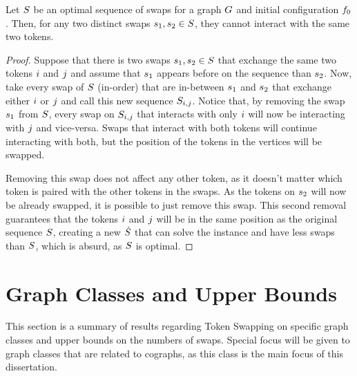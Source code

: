 \documentclass[msc]{ppgccufmg}    %
\begin{document}
\begin{corollary}
\label{cor:sametokens}
Let $S$ be an optimal sequence of swaps for a graph $G$ and
initial configuration $f_{0}$.
Then, for any two distinct swaps $s_{1},s_{2} \in S$,
they cannot interact with the same two tokens.
\end{corollary}

\begin{proof}
Suppose that there is two swaps $s_{1},s_{2} \in S$ that 
exchange the same two tokens $i$ and $j$ and assume that $s_{1}$
appears before on the sequence than $s_{2}$.
Now, take every swap of $S$ (in-order) that are in-between $s_{1}$ 
and $s_{2}$ that exchange either $i$ or $j$ and call this
new sequence $S_{i,j}$.
Notice that, by removing the swap $s_{1}$ from $S$, every swap
on $S_{i,j}$ that interacts with only $i$ will now
be interacting with $j$ and vice-versa.
Swaps that interact with both tokens will continue interacting with both, 
but the position of the tokens in the vertices will be swapped.

Removing this swap does not affect any other token, as it doesn't matter
which token is paired with the other tokens in the swaps.
As the tokens on $s_{2}$ will now be already swapped, it is possible
to just remove this swap.
This second removal guarantees that the tokens $i$ and $j$ will
be in the same position as the original sequence $S$, creating a new
$\dot{S}$ that can solve the instance and have less swaps than
$S$, which is absurd, as $S$ is optimal.
\end{proof}

\section{Graph Classes and Upper Bounds}
\label{sec:intro:classes_uppers}

This section is a summary of results regarding  Token Swapping
on specific graph classes and upper bounds on the numbers of swaps.
Special focus will be given to graph classes that are related to
cographs, as this class is the main focus of this dissertation.

\end{document}
